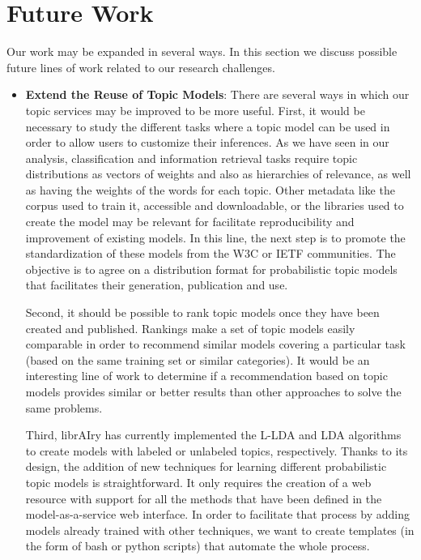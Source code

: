 \section{Future Work}

Our work may be expanded in several ways. In this section we discuss possible future lines of work related to our research challenges.

\begin{itemize}
\item \textbf{Extend the Reuse of Topic Models}: There are several ways in which our topic services may be improved to be more useful. First, it would be necessary to study the different tasks where a topic model can be used in order to allow users to customize their inferences. As we have seen in our analysis, classification and information retrieval tasks require topic distributions as vectors of weights and also as hierarchies of relevance, as well as having the weights of the words for each topic. Other metadata like the corpus used to train it, accessible and downloadable, or the libraries used to create the model may be relevant for facilitate reproducibility and improvement of existing models. In this line, the next step is to promote the standardization of these models from the W3C or IETF communities. The objective is to agree on a distribution format for probabilistic topic models that facilitates their generation, publication and use.

Second, it should be possible to rank topic models once they have been created and published. Rankings make a set of topic models easily comparable in order to recommend similar models covering a particular task (based on the same training set or similar categories). It would be an interesting line of work to determine if a recommendation based on topic models provides similar or better results than other approaches to solve the same problems.

Third, librAIry has currently implemented the L-LDA and LDA algorithms to create models with labeled or unlabeled topics, respectively. Thanks to its design, the addition of new techniques for learning different probabilistic topic models is straightforward. It only requires the creation of a web resource with support for all the methods that have been defined in the model-as-a-service web interface. In order to facilitate that process by adding models already trained with other techniques, we want to create templates (in the form of bash or python scripts) that automate the whole process.


\end{itemize}
